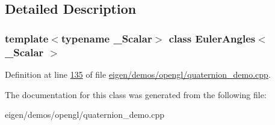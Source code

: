 \subsection{Detailed Description}
\subsubsection*{template$<$typename \+\_\+\+Scalar$>$\newline
class Euler\+Angles$<$ \+\_\+\+Scalar $>$}



Definition at line \hyperlink{eigen_2demos_2opengl_2quaternion__demo_8cpp_source_l00135}{135} of file \hyperlink{eigen_2demos_2opengl_2quaternion__demo_8cpp_source}{eigen/demos/opengl/quaternion\+\_\+demo.\+cpp}.



The documentation for this class was generated from the following file\+:\begin{DoxyCompactItemize}
\item 
eigen/demos/opengl/quaternion\+\_\+demo.\+cpp\end{DoxyCompactItemize}
